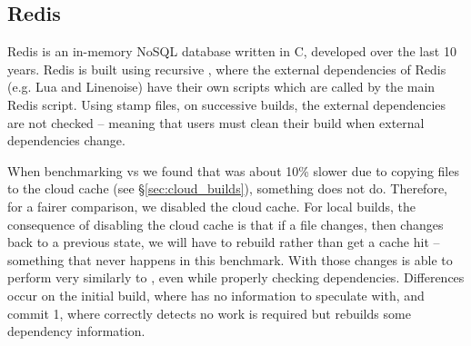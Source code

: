 
\subsection{Redis}
\label{sec:eval:redis}


Redis is an in-memory NoSQL database written in C, developed over the last 10 years. Redis is built using recursive \Make \cite{miller:recursive_make}, where the external dependencies of Redis (e.g. Lua and Linenoise) have their own \Make scripts which are called by the main Redis \Make script. Using stamp files, on successive builds, the external dependencies are not checked -- meaning that users must clean their build when external dependencies change.

When benchmarking \Rattle vs \Make we found that \Rattle was about 10\% slower due to copying files to the cloud cache (see \S\ref{sec:cloud_builds}), something \Make does not do. Therefore, for a fairer comparison, we disabled the cloud cache. For local builds, the consequence of disabling the cloud cache is that if a file changes, then changes back to a previous state, we will have to rebuild rather than get a cache hit -- something that never happens in this benchmark. With those changes \Rattle is able to perform very similarly to \Make, even while properly checking dependencies. Differences occur on the initial build, where \Rattle has no information to speculate with, and commit 1, where \Rattle correctly detects no work is required but \Make rebuilds some dependency information.

